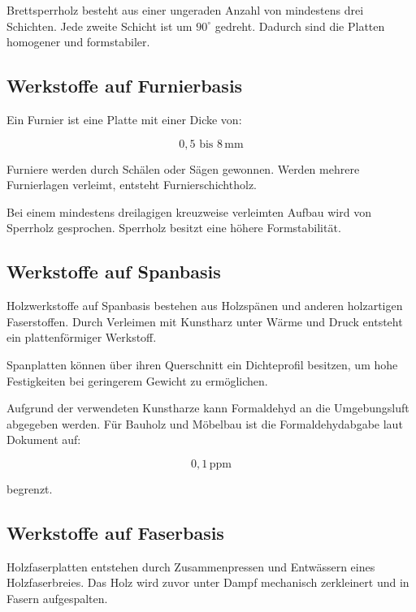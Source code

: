 \documentclass[
  12pt,
  a4paper,
  oneside
]{scrreprt}
\begin{document}
Brettsperrholz besteht aus einer ungeraden Anzahl von mindestens drei
Schichten. Jede zweite Schicht ist um $90^\circ$ gedreht. Dadurch sind
die Platten homogener und formstabiler. 

\subsection{Werkstoffe auf Furnierbasis}

Ein Furnier ist eine Platte mit einer Dicke von:

\begin{equation}
  0{,}5 \text{ bis } 8\,\mathrm{mm}
\end{equation}

Furniere werden durch Schälen oder Sägen gewonnen. Werden mehrere
Furnierlagen verleimt, entsteht Furnierschichtholz. 

Bei einem mindestens dreilagigen kreuzweise verleimten Aufbau wird von
Sperrholz gesprochen. Sperrholz besitzt eine höhere Formstabilität.


\subsection{Werkstoffe auf Spanbasis}

Holzwerkstoffe auf Spanbasis bestehen aus Holzspänen und anderen
holzartigen Faserstoffen. Durch Verleimen mit Kunstharz unter Wärme und
Druck entsteht ein plattenförmiger Werkstoff. 

Spanplatten können über ihren Querschnitt ein Dichteprofil besitzen, um
hohe Festigkeiten bei geringerem Gewicht zu ermöglichen. 

Aufgrund der verwendeten Kunstharze kann Formaldehyd an die
Umgebungsluft abgegeben werden. Für Bauholz und Möbelbau ist die
Formaldehydabgabe laut Dokument auf:

\begin{equation}
  0{,}1\,\mathrm{ppm}
\end{equation}

begrenzt. 

\subsection{Werkstoffe auf Faserbasis}

Holzfaserplatten entstehen durch Zusammenpressen und Entwässern eines
Holzfaserbreies. Das Holz wird zuvor unter Dampf mechanisch zerkleinert
und in Fasern aufgespalten. 
\end{document}
